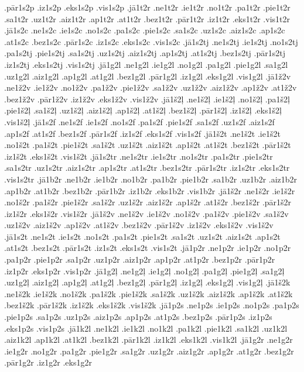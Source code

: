 {.pār1s2p
.iz1s2p
.eks1s2p
.vis1s2p
.jā1t2r
.ne1t2r
.ie1t2r
.no1t2r
.pa1t2r
.pie1t2r
.sa1t2r
.uz1t2r
.aiz1t2r
.ap1t2r
.at1t2r
.bez1t2r
.pār1t2r
.iz1t2r
.eks1t2r
.vis1t2r
.jā1s2c
.ne1s2c
.ie1s2c
.no1s2c
.pa1s2c
.pie1s2c
.sa1s2c
.uz1s2c
.aiz1s2c
.ap1s2c
.at1s2c
.bez1s2c
.pār1s2c
.iz1s2c
.eks1s2c
.vis1s2c
.jā1s2tj
.ne1s2tj
.ie1s2tj
.no1s2tj
.pa1s2tj
.pie1s2tj
.sa1s2tj
.uz1s2tj
.aiz1s2tj
.ap1s2tj
.at1s2tj
.bez1s2tj
.pār1s2tj
.iz1s2tj
.eks1s2tj
.vis1s2tj
.jā1g2l
.ne1g2l
.ie1g2l
.no1g2l
.pa1g2l
.pie1g2l
.sa1g2l
.uz1g2l
.aiz1g2l
.ap1g2l
.at1g2l
.bez1g2l
.pār1g2l
.iz1g2l
.eks1g2l
.vis1g2l
.jā1ž2v
.ne1ž2v
.ie1ž2v
.no1ž2v
.pa1ž2v
.pie1ž2v
.sa1ž2v
.uz1ž2v
.aiz1ž2v
.ap1ž2v
.at1ž2v
.bez1ž2v
.pār1ž2v
.iz1ž2v
.eks1ž2v
.vis1ž2v
.jā1š2ļ
.ne1š2ļ
.ie1š2ļ
.no1š2ļ
.pa1š2ļ
.pie1š2ļ
.sa1š2ļ
.uz1š2ļ
.aiz1š2ļ
.ap1š2ļ
.at1š2ļ
.bez1š2ļ
.pār1š2ļ
.iz1š2ļ
.eks1š2ļ
.vis1š2ļ
.jā1s2f
.ne1s2f
.ie1s2f
.no1s2f
.pa1s2f
.pie1s2f
.sa1s2f
.uz1s2f
.aiz1s2f
.ap1s2f
.at1s2f
.bez1s2f
.pār1s2f
.iz1s2f
.eks1s2f
.vis1s2f
.jā1š2t
.ne1š2t
.ie1š2t
.no1š2t
.pa1š2t
.pie1š2t
.sa1š2t
.uz1š2t
.aiz1š2t
.ap1š2t
.at1š2t
.bez1š2t
.pār1š2t
.iz1š2t
.eks1š2t
.vis1š2t
.jā1s2tr
.ne1s2tr
.ie1s2tr
.no1s2tr
.pa1s2tr
.pie1s2tr
.sa1s2tr
.uz1s2tr
.aiz1s2tr
.ap1s2tr
.at1s2tr
.bez1s2tr
.pār1s2tr
.iz1s2tr
.eks1s2tr
.vis1s2tr
.jā1b2r
.ne1b2r
.ie1b2r
.no1b2r
.pa1b2r
.pie1b2r
.sa1b2r
.uz1b2r
.aiz1b2r
.ap1b2r
.at1b2r
.bez1b2r
.pār1b2r
.iz1b2r
.eks1b2r
.vis1b2r
.jā1š2r
.ne1š2r
.ie1š2r
.no1š2r
.pa1š2r
.pie1š2r
.sa1š2r
.uz1š2r
.aiz1š2r
.ap1š2r
.at1š2r
.bez1š2r
.pār1š2r
.iz1š2r
.eks1š2r
.vis1š2r
.jā1š2v
.ne1š2v
.ie1š2v
.no1š2v
.pa1š2v
.pie1š2v
.sa1š2v
.uz1š2v
.aiz1š2v
.ap1š2v
.at1š2v
.bez1š2v
.pār1š2v
.iz1š2v
.eks1š2v
.vis1š2v
.jā1s2t
.ne1s2t
.ie1s2t
.no1s2t
.pa1s2t
.pie1s2t
.sa1s2t
.uz1s2t
.aiz1s2t
.ap1s2t
.at1s2t
.bez1s2t
.pār1s2t
.iz1s2t
.eks1s2t
.vis1s2t
.jā1p2r
.ne1p2r
.ie1p2r
.no1p2r
.pa1p2r
.pie1p2r
.sa1p2r
.uz1p2r
.aiz1p2r
.ap1p2r
.at1p2r
.bez1p2r
.pār1p2r
.iz1p2r
.eks1p2r
.vis1p2r
.jā1g2ļ
.ne1g2ļ
.ie1g2ļ
.no1g2ļ
.pa1g2ļ
.pie1g2ļ
.sa1g2ļ
.uz1g2ļ
.aiz1g2ļ
.ap1g2ļ
.at1g2ļ
.bez1g2ļ
.pār1g2ļ
.iz1g2ļ
.eks1g2ļ
.vis1g2ļ
.jā1š2k
.ne1š2k
.ie1š2k
.no1š2k
.pa1š2k
.pie1š2k
.sa1š2k
.uz1š2k
.aiz1š2k
.ap1š2k
.at1š2k
.bez1š2k
.pār1š2k
.iz1š2k
.eks1š2k
.vis1š2k
.jā1p2s
.ne1p2s
.ie1p2s
.no1p2s
.pa1p2s
.pie1p2s
.sa1p2s
.uz1p2s
.aiz1p2s
.ap1p2s
.at1p2s
.bez1p2s
.pār1p2s
.iz1p2s
.eks1p2s
.vis1p2s
.jā1k2l
.ne1k2l
.ie1k2l
.no1k2l
.pa1k2l
.pie1k2l
.sa1k2l
.uz1k2l
.aiz1k2l
.ap1k2l
.at1k2l
.bez1k2l
.pār1k2l
.iz1k2l
.eks1k2l
.vis1k2l
.jā1g2r
.ne1g2r
.ie1g2r
.no1g2r
.pa1g2r
.pie1g2r
.sa1g2r
.uz1g2r
.aiz1g2r
.ap1g2r
.at1g2r
.bez1g2r
.pār1g2r
.iz1g2r
.eks1g2r
}
